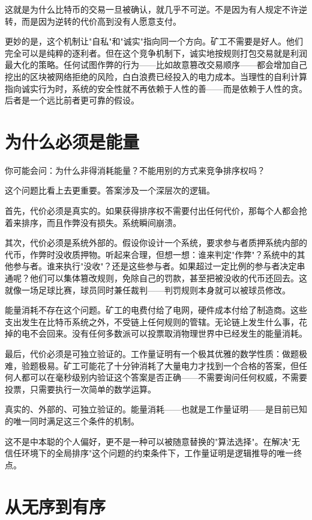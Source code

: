 \documentclass[a4paper,12pt,openany]{ctexbook}
\begin{document}
这就是为什么比特币的交易一旦被确认，就几乎不可逆。不是因为有人规定不许逆转，而是因为逆转的代价高到没有人愿意支付。

更妙的是，这个机制让"自私"和"诚实"指向同一个方向。矿工不需要是好人。他们完全可以是纯粹的逐利者。但在这个竞争机制下，诚实地按规则打包交易就是利润最大化的策略。任何试图作弊的行为——比如故意篡改交易顺序——都会增加自己挖出的区块被网络拒绝的风险，白白浪费已经投入的电力成本。当理性的自利计算指向诚实行为时，系统的安全性就不再依赖于人性的善——而是依赖于人性的贪。后者是一个远比前者更可靠的假设。


\section*{为什么必须是能量}


你可能会问：为什么非得消耗能量？不能用别的方式来竞争排序权吗？

这个问题比看上去更重要。答案涉及一个深层次的逻辑。

首先，代价必须是真实的。如果获得排序权不需要付出任何代价，那每个人都会抢着来排序，而且作弊没有损失。系统瞬间崩溃。

其次，代价必须是系统外部的。假设你设计一个系统，要求参与者质押系统内部的代币，作弊时没收质押物。听起来合理，但想一想：谁来判定"作弊"？系统中的其他参与者。谁来执行"没收"？还是这些参与者。如果超过一定比例的参与者决定串通呢？他们可以集体篡改规则，免除自己的罚款，甚至把被没收的代币还回去。这就像一场足球比赛，球员同时兼任裁判——判罚规则本身就可以被球员修改。

能量消耗不存在这个问题。矿工的电费付给了电网，硬件成本付给了制造商。这些支出发生在比特币系统之外，不受链上任何规则的管辖。无论链上发生什么事，花掉的电不会回来。没有任何多数派可以投票取消物理世界中已经发生的能量消耗。

最后，代价必须是可独立验证的。工作量证明有一个极其优雅的数学性质：做题极难，验题极易。矿工可能花了十分钟消耗了大量电力才找到一个合格的答案，但任何人都可以在毫秒级别内验证这个答案是否正确——不需要询问任何权威，不需要投票，只需要执行一次简单的数学运算。

真实的、外部的、可独立验证的。能量消耗——也就是工作量证明——是目前已知的唯一同时满足这三个条件的机制。

这不是中本聪的个人偏好，更不是一种可以被随意替换的"算法选择"。在解决"无信任环境下的全局排序"这个问题的约束条件下，工作量证明是逻辑推导的唯一终点。


\section*{从无序到有序}
\end{document}
